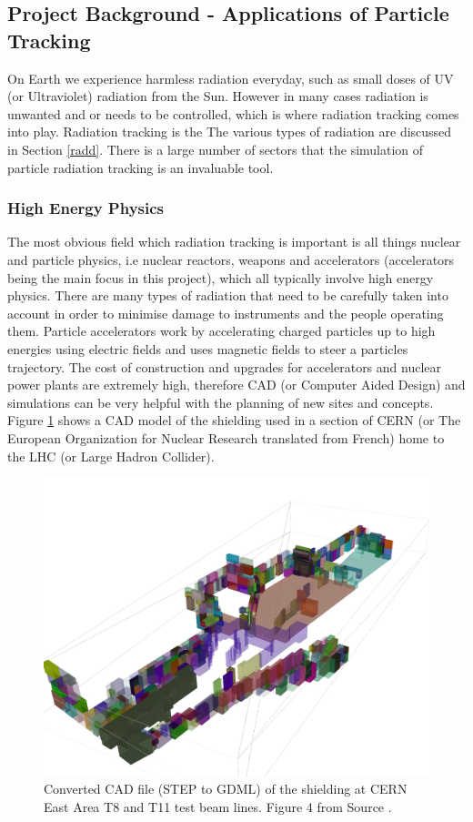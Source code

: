 \documentclass[12pt,a4paper]{article}
\begin{document}
\subsection{Project Background - Applications of Particle Tracking}
\label{back}
On Earth we experience harmless radiation everyday, such as small doses of UV (or Ultraviolet) radiation from the Sun. However in many cases radiation is unwanted and or needs to be controlled, which is where radiation tracking comes into play. Radiation tracking is the The various types of radiation are discussed in Section \ref{radd}. There is a large number of sectors that the simulation of particle radiation tracking is an invaluable tool.

\subsubsection{High Energy Physics}
\noindent The most obvious field which radiation tracking is important is all things nuclear and particle physics, i.e nuclear reactors, weapons and accelerators (accelerators being the main focus in this project), which all typically involve high energy physics. There are many types of radiation that need to be carefully taken into account in order to minimise damage to instruments and the people operating them. Particle accelerators work by accelerating charged particles up to high energies using electric fields and uses magnetic fields to steer a particles trajectory. The cost of construction and upgrades for accelerators and nuclear power plants are extremely high, therefore CAD (or Computer Aided Design) and simulations can be very helpful with the planning of new sites and concepts. Figure \ref{cerncad} shows a CAD model of the shielding used in a section of CERN (or The European Organization for Nuclear Research translated from French) home to the LHC (or Large Hadron Collider).

\begin{figure}[h!]
\centering
\includegraphics[scale=0.15]{Images//introduction//CernEast.jpg}
\caption[width=\columnwidth]{Converted CAD file (STEP to GDML) of the shielding at CERN East Area T8 and T11 test beam lines. Figure 4 from Source \cite{pyg4om}.}
\label{cerncad}
\end{figure}
\end{document}
